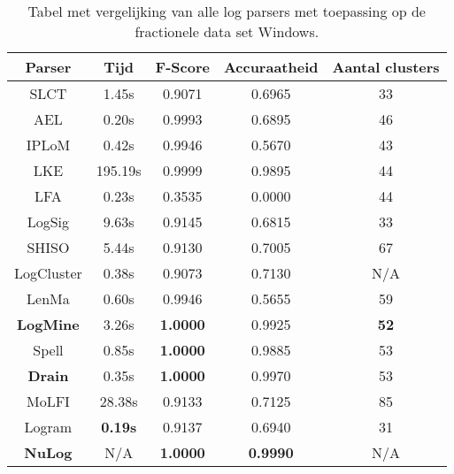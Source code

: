 \begin{table}[!htp]
    \caption{Tabel met vergelijking van alle log parsers met toepassing op de fractionele data set Windows.}
    \label{table:Windows}
    \begin{center}
        \begin{tabular}{||c | c | c | c | c||} 
            \hline
            Parser & Tijd & F-Score & Accuraatheid & Aantal clusters \\ [0.5ex] 
            \hline\hline
            SLCT & 1.45s & 0.9071 & 0.6965 & 33 \\
            
            AEL & 0.20s & 0.9993 & 0.6895 & 46 \\ 
            
            IPLoM & 0.42s & 0.9946 & 0.5670 & 43 \\
            
            LKE & 195.19s & 0.9999 & 0.9895 & 44 \\
            
            LFA & 0.23s & 0.3535 & 0.0000 & 44 \\
            
            LogSig & 9.63s & 0.9145 & 0.6815 & 33 \\
            
            SHISO & 5.44s & 0.9130 & 0.7005 & 67 \\
            
            LogCluster & 0.38s & 0.9073 & 0.7130 & N/A \\
            
            LenMa & 0.60s & 0.9946 & 0.5655 & 59 \\
            
            \textbf{LogMine} & 3.26s & \textbf{1.0000} & 0.9925 & \textbf{52} \\
            
            Spell & 0.85s & \textbf{1.0000} & 0.9885 & 53 \\
            
            \textbf{Drain} & 0.35s & \textbf{1.0000} & 0.9970 & 53 \\
            
            MoLFI & 28.38s & 0.9133 & 0.7125 & 85 \\
            
            Logram & \textbf{0.19s} & 0.9137 & 0.6940 & 31 \\
            
            \textbf{NuLog} & N/A & \textbf{1.0000} & \textbf{0.9990} & N/A \\
            \hline
        \end{tabular}
    \end{center}
\end{table}

